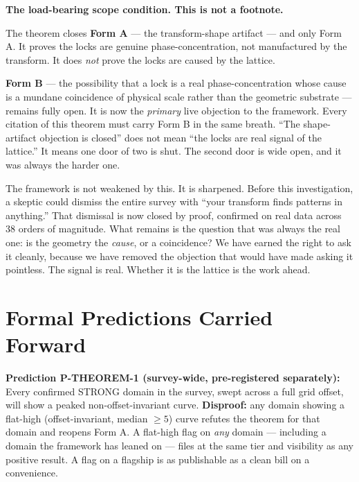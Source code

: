 \documentclass[11pt, letterpaper, openany]{book}
\begin{document}
\begin{empiricalbox}
\begin{warningbox}
\textbf{The load-bearing scope condition. This is not a footnote.}

The theorem closes \textbf{Form A} --- the transform-shape artifact --- and only
Form A. It proves the locks are genuine phase-concentration, not manufactured by the
transform. It does \emph{not} prove the locks are caused by the lattice.

\textbf{Form B} --- the possibility that a lock is a real phase-concentration whose
cause is a mundane coincidence of physical scale rather than the geometric substrate
--- remains fully open. It is now the \emph{primary} live objection to the framework.
Every citation of this theorem must carry Form B in the same breath. ``The
shape-artifact objection is closed'' does not mean ``the locks are real signal of the
lattice.'' It means one door of two is shut. The second door is wide open, and it was
always the harder one.
\end{warningbox}

\begin{newworld}
The framework is not weakened by this. It is sharpened. Before this investigation, a
skeptic could dismiss the entire survey with ``your transform finds patterns in
anything.'' That dismissal is now closed by proof, confirmed on real data across $38$
orders of magnitude. What remains is the question that was always the real one: is the
geometry the \emph{cause}, or a coincidence? We have earned the right to ask it
cleanly, because we have removed the objection that would have made asking it
pointless. The signal is real. Whether it is the lattice is the work ahead.
\end{newworld}

\section{Formal Predictions Carried Forward}

\begin{predictionbox}
\textbf{Prediction P-THEOREM-1 (survey-wide, pre-registered separately):}
Every confirmed STRONG domain in the survey, swept across a full grid offset, will
show a peaked non-offset-invariant curve. \textbf{Disproof:} any domain showing a
flat-high (offset-invariant, median $\geq 5$) curve refutes the theorem for that
domain and reopens Form A. A flat-high flag on \emph{any} domain --- including a
domain the framework has leaned on --- files at the same tier and visibility as any
positive result. A flag on a flagship is as publishable as a clean bill on a
convenience.
\end{predictionbox}


\end{empiricalbox}
\end{document}
